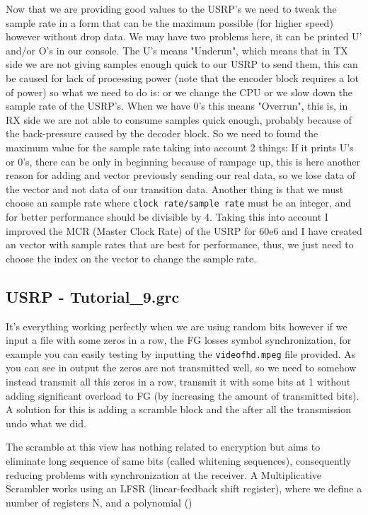 \documentclass[a4paper, 10pt, conference]{ieeeconf}      %
\begin{document}
    Now that we are providing good values to the USRP's we need to tweak the sample rate in a form that can be the maximum possible (for higher speed) however without drop data. We may have two problems here, it can be printed U' and/or O's in our console. The U's means "Underun", which means that in TX side we are not giving samples enough quick to our USRP to send them, this can be caused for lack of processing power (note that the encoder block requires a lot of power) so what we need to do is: or we change the CPU or we slow down the sample rate of the USRP's. When we have 0's this means "Overrun", this is, in RX side we are not able to consume samples quick enough, probably because of the back-pressure caused by the decoder block. So we need to found the maximum value for the sample rate taking into account 2 things: If it prints U's or 0's, there can be only in beginning because of rampage up, this is here another reason for adding and vector previously sending our real data, so we lose data of the vector and not data of our transition data. Another thing is that we must choose an sample rate where \verb|clock rate/sample rate| must be an integer, and for better performance should be divisible by 4.
    Taking this into account I improved the MCR (Master Clock Rate) of the USRP for 60e6 and I have created an vector with sample rates that are best for performance, thus, we just need to choose the index on the vector to change the sample rate.
    
\subsection{USRP - Tutorial\_9.grc}
    It's everything working perfectly when we are using random bits however if we input a file with some zeros in a row, the FG losses symbol synchronization, for example you can easily testing by inputting the \verb|videofhd.mpeg| file provided. As you can see in output the zeros are not transmitted well, so we need to somehow instead transmit all this zeros in a row, transmit it with some bits at 1 without adding significant overload to FG (by increasing the amount of transmitted bits). A solution for this is adding a scramble block and the after all the transmission undo what we did.
    
    
    The scramble at this view has nothing related to encryption but aims to eliminate long sequence of same bits (called whitening sequences), consequently reducing problems with synchronization at the receiver. A Multiplicative Scrambler works using an LFSR (linear-feedback shift register), where we define a number of registers N, and a polynomial ()
    
\end{document}
